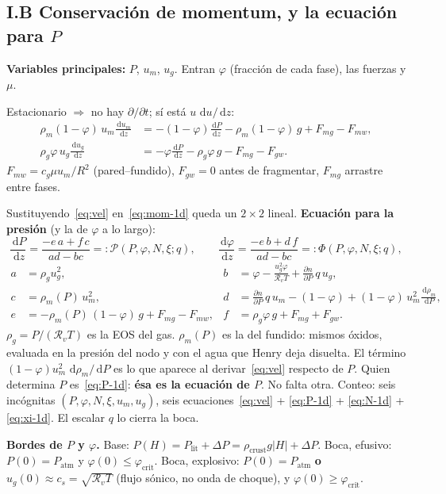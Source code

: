 \documentclass[11pt,a4paper]{article}
\newcommand{\dd}{\,\mathrm{d}}
\newcommand{\p}{\partial}
\newcommand{\Rv}{\mathcal{R}_v}
\begin{document}
\subsection*{I.B Conservación de momentum, y la ecuación para $P$}

\textbf{Variables principales:} $P$, $u_m$, $u_g$.
Entran $\varphi$ (fracción de cada fase), las fuerzas y $\mu$.

Estacionario $\Rightarrow$ no hay $\p/\p t$; sí está
$u\,\dd u/\dd z$:
\begin{align}
\label{eq:mom-1d}
\rho_m(1-\varphi)\,u_m\frac{\dd u_m}{\dd z}
&=-(1-\varphi)\frac{\dd P}{\dd z}
-\rho_m(1-\varphi)\,g
+F_{mg}-F_{mw},
\\
\rho_g\varphi\,u_g\frac{\dd u_g}{\dd z}
&=-\varphi\frac{\dd P}{\dd z}
-\rho_g\varphi\,g
-F_{mg}-F_{gw}.
\end{align}
$F_{mw}=c_g\mu u_m/R^2$ (pared--fundido), $F_{gw}=0$ antes de
fragmentar, $F_{mg}$ arrastre entre fases.

Sustituyendo~\eqref{eq:vel} en~\eqref{eq:mom-1d} queda un
$2\times 2$ lineal. \textbf{Ecuación para la presión} (y la
de $\varphi$ a lo largo):
\begin{equation}
\label{eq:P-1d}
\frac{\dd P}{\dd z}
=\frac{-e\,a+f\,c}{ad-bc}
=:\mathcal{P}(P,\varphi,N,\xi;q),
\qquad
\frac{\dd\varphi}{\dd z}
=\frac{-e\,b+d\,f}{ad-bc}
=:\Phi(P,\varphi,N,\xi;q),
\end{equation}
\begin{align*}
a&=\rho_g u_g^2, &
b&=\varphi-\frac{u_g^2\varphi}{\Rv T}+\frac{\p n}{\p P}\,q\,u_g,\\
c&=\rho_m(P)\,u_m^2, &
d&=\frac{\p n}{\p P}\,q\,u_m-(1-\varphi)
+(1-\varphi)\,u_m^2\frac{\dd\rho_m}{\dd P},\\
e&=-\rho_m(P)\,(1-\varphi)\,g+F_{mg}-F_{mw}, &
f&=\rho_g\varphi\,g+F_{mg}+F_{gw}.
\end{align*}
$\rho_g=P/(\Rv T)$ es la EOS del gas.
$\rho_m(P)$ es la del fundido: mismos óxidos, evaluada en
la presión del nodo y con el agua que Henry deja disuelta.
El término $(1-\varphi)u_m^2\,\dd\rho_m/\dd P$ es lo que
aparece al derivar~\eqref{eq:vel} respecto de $P$.
Quien determina $P$ es~\eqref{eq:P-1d}:
\textbf{ésa es la ecuación de $P$}. No falta otra.
Conteo: seis incógnitas $(P,\varphi,N,\xi,u_m,u_g)$, seis
ecuaciones~\eqref{eq:vel} + \eqref{eq:P-1d} + \eqref{eq:N-1d}
+ \eqref{eq:xi-1d}. El escalar $q$ lo cierra la boca.

\textbf{Bordes de $P$ y $\varphi$.}
Base: $P(H)=P_{\mathrm{lit}}+\Delta P=\rho_{\mathrm{crust}}g|H|+\Delta P$.
Boca, efusivo: $P(0)=P_{\mathrm{atm}}$ y
$\varphi(0)\le\varphi_{\mathrm{crit}}$.
Boca, explosivo: $P(0)=P_{\mathrm{atm}}$ \textbf{o}
$u_g(0)\approx c_s=\sqrt{\Rv T}$ (flujo sónico, no onda de
choque), y $\varphi(0)\ge\varphi_{\mathrm{crit}}$.
\end{document}
